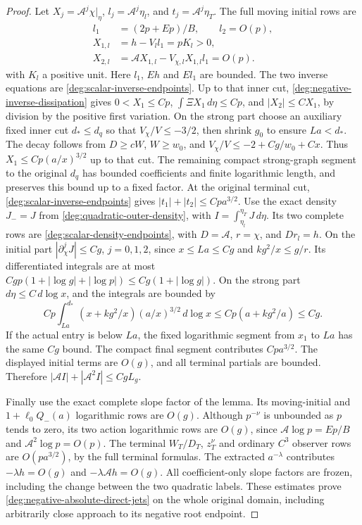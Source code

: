 \begin{proof}
Let \(X_j=\mathcal A^j\chi|_\eta\),
\(l_j=\mathcal A^j\eta_l\), and \(t_j=\mathcal A^j\eta_T\).
The full moving initial rows are
\begin{align*}
 l_1&=(2p+Ep)/B,\qquad l_2=O(p),\\
 X_{1,l}&=h-V_ll_1=pK_l>0,\\
 X_{2,l}&=\mathcal A X_{1,l}-V_{\chi,l}X_{1,l}l_1=O(p).
\end{align*}
with \(K_l\) a positive unit. Here \(l_1\), \(Eh\) and \(El_1\)
are bounded. The two inverse equations are \eqref{deg:scalar-inverse-endpoints}.
Up to that inner cut, \eqref{deg:negative-inverse-dissipation} gives
\(0<X_1\le Cp\), \(\int\Xi X_1\,d\eta\le Cp\), and
\(|X_2|\le CX_1\), by division by the positive first variation.
On the strong part choose an auxiliary fixed inner cut \(d_*\le d_q\)
so that \(V_\chi/V\le-3/2\), then shrink \(g_0\) to ensure
\(La<d_*\). The decay follows from
\(D\ge cW\), \(W\ge w_0\), and
\(V_\chi/V\le-2+Cg/w_0+Cx\).
Thus \(X_1\le Cp(a/x)^{3/2}\) up to that cut.
The remaining compact strong-graph segment to the original \(d_q\)
has bounded coefficients and finite logarithmic length, and preserves
this bound up to a fixed factor. At the original terminal cut, \eqref{deg:scalar-inverse-endpoints}
gives \(|t_1|+|t_2|\le Cp a^{3/2}\).
Use the exact density \(J_-=J\) from
\eqref{deg:quadratic-outer-density}, with
\(I=\int_{\eta_l}^{\eta_T}J\,d\eta\).
Its two complete rows are \eqref{deg:scalar-density-endpoints},
with \(D=\mathcal A\), \(r=\chi\), and \(Dr_l=h\).
On the initial part \(|\partial_\chi^jJ|\le Cg\), \(j=0,1,2\),
since \(x\le La\le Cg\) and \(kg^2/x\le g/r\).
Its differentiated integrals are at most
\(Cgp(1+|\log g|+|\log p|)\le Cg(1+|\log g|)\).
On the strong part \(d\eta\le C\,d\log x\), and the integrals are
bounded by
\[
 Cp\int_{La}^{d_*}(x+kg^2/x)(a/x)^{3/2}\,d\log x
 \le Cp(a+kg^2/a)\le Cg.
\]
If the actual entry is below \(La\), the fixed logarithmic segment
from \(x_1\) to \(La\) has the same \(Cg\) bound.
The compact final segment contributes \(Cp a^{3/2}\).
The displayed initial terms are \(O(g)\), and all terminal partials
are bounded. Therefore \(|\mathcal AI|+|\mathcal A^2I|\le CgL_g\).

Finally use the exact complete slope factor of the lemma.
Its moving-initial and \(1+\ell_0Q_-(a)\) logarithmic rows are
\(O(g)\). Although \(p^{-\nu}\) is unbounded as \(p\) tends to zero,
its two action logarithmic rows are \(O(g)\), since
\(\mathcal A\log p=Ep/B\) and \(\mathcal A^2\log p=O(p)\).
The terminal \(W_T/D_T\), \(z_T^\nu\) and ordinary \(C^3\) observer
rows are \(O(p a^{3/2})\), by the full terminal formulas.
The extracted \(a^{-\lambda}\) contributes \(-\lambda h=O(g)\)
and \(-\lambda\mathcal Ah=O(g)\).
All coefficient-only slope factors are frozen, including the change
between the two quadratic labels. These estimates prove
\eqref{deg:negative-absolute-direct-jets} on the whole original domain,
including arbitrarily close approach to its negative root endpoint.
\end{proof}

